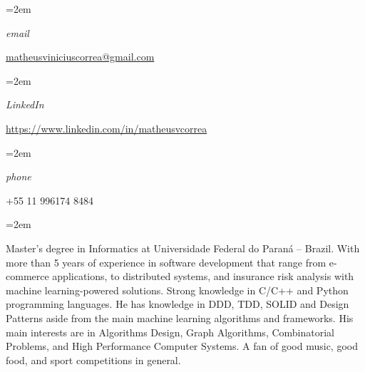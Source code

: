 \documentclass[fontsize=14pt,paper=a4]{scrartcl}
\date{} %
\newcommand{\ProfileInfo}[2]{\noindent\hangindent=2em\hangafter=0
  \parbox{5em}{\small \textit{#1}\hspace{1em}} {\small #2}}
\newcommand{\Description}[1]{\hangindent=2em\hangafter=0%
  \noindent\raggedright\footnotesize{#1}\par\flushleft\normalsize}
\begin{document}
\pagestyle{scrheadings}


\begin{cv}{%
    \noindent%
  } %
  
  
  \vspace{.5em}
  
  \ProfileInfo{email}{\href{mailto:matheusviniciuscorrea@gmail.com}{matheusviniciuscorrea@gmail.com}}

  \ProfileInfo{LinkedIn}{\href{https://www.linkedin.com/in/matheusvcorrea}{https://www.linkedin.com/in/matheusvcorrea}}

  \ProfileInfo{phone}{+55 11 996174 8484}
  
  \vspace{1em}

  \noindent{}\vspace{.5em}
  
  \Description{%
    Master's degree in Informatics at Universidade Federal do Paraná --
    Brazil. With more than 5 years of experience in software development that
    range from e-commerce applications, to distributed systems, and insurance
    risk analysis with machine learning-powered solutions. Strong knowledge in
    C/C++ and Python programming languages. He has knowledge in DDD, TDD, SOLID
    and Design Patterns aside from the main machine learning algorithms and
    frameworks. His main interests are in Algorithms Design, Graph Algorithms,
    Combinatorial Problems, and High Performance Computer Systems. A fan of good
    music, good food, and sport competitions in general.%
  }


\end{cv}
\end{document}
